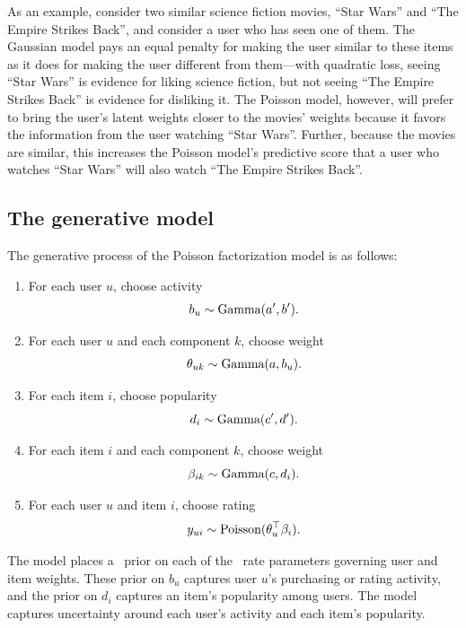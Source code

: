 \documentclass{sig-alternate}
\begin{document}
As an example, consider two similar science fiction movies, ``Star
Wars'' and ``The Empire Strikes Back'', and consider a user who has
seen one of them.  The Gaussian model pays an equal penalty for making
the user similar to these items as it does for making the user
different from them---with quadratic loss, seeing ``Star Wars'' is
evidence for liking science fiction, but not seeing ``The Empire
Strikes Back'' is evidence for disliking it.  The Poisson model,
however, will prefer to bring the user's latent weights closer to the
movies' weights because it favors the information from the user
watching ``Star Wars''. Further, because the movies are similar, this
increases the Poisson model's predictive score that a user who watches
``Star Wars'' will also watch ``The Empire Strikes Back''.


\subsection{The generative model}

The generative process of the Poisson factorization model is as
follows:
\begin{enumerate}
\item For each user $u$, choose activity
  \begin{equation*}
    b_u \sim \textrm{Gamma}(a', b').
  \end{equation*}
\item For each user $u$ and each component $k$, choose weight
  \begin{equation*}
    \theta_{uk} \sim \textrm{Gamma}(a, b_u).
  \end{equation*}
\item For each item $i$, choose popularity
  \begin{equation*}
    d_i \sim \textrm{Gamma}(c', d').
  \end{equation*}
\item For each item $i$ and each component $k$, choose weight
  \begin{equation*}
    \beta_{ik} \sim \textrm{Gamma}(c, d_i).
  \end{equation*}
\item For each user $u$ and item $i$, choose rating
  \begin{equation*}
    y_{ui} \sim \textrm{Poisson}(\theta_u^\top \beta_i).
  \end{equation*}
\end{enumerate}
The model places a \gam~prior on each of the \gam~rate parameters
governing user and item weights. These prior on $b_u$ captures user
$u$'s purchasing or rating activity, and the prior on $d_i$ captures
an item's popularity among users. The model captures uncertainty
around each user's activity and each item's popularity.
\end{document}
